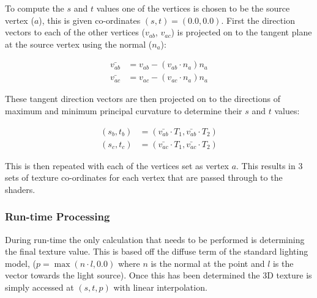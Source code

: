       To compute the $s$ and $t$ values one of the vertices is chosen to be the
      source vertex ($a$), this is given co-ordinates $\left(s, t\right) =
      \left(0.0, 0.0\right)$.  First the direction vectors to each of the other
      vertices ($v_{ab}$, $v_{ac}$) is projected on to the tangent plane at the
      source vertex using the normal ($n_a$):

      \begin{align}
        \bar{v_{ab}} &= v_{ab} - \left(v_{ab} \cdot n_a\right) n_a \\
        \bar{v_{ac}} &= v_{ac} - \left(v_{ac} \cdot n_a\right) n_a
      \end{align}

      These tangent direction vectors are then projected on to the directions of
      maximum and minimum principal curvature to determine their $s$ and $t$
      values:

      \begin{align}
        \left(s_b, t_b\right) &= \left(
          \bar{v_{ab}} \cdot T_1, \bar{v_{ab}} \cdot T_2
        \right) \\
        \left(s_c, t_c\right) &= \left(
          \bar{v_{ac}} \cdot T_1, \bar{v_{ac}} \cdot T_2
        \right)
      \end{align}

      This is then repeated with each of the vertices set as vertex $a$.  This
      results in 3 sets of texture co-ordinates for each vertex that are passed
      through to the shaders.

    \subsubsection{Run-time Processing}

      During run-time the only calculation that needs to be performed is
      determining the final texture value.  This is based off the diffuse term
      of the standard lighting model, ($p = \max\left(n \cdot l, 0.0\right)$
      where $n$ is the normal at the point and $l$ is the vector towards the
      light source).  Once this has been determined the 3D texture is simply
      accessed at $\left(s, t, p\right)$ with linear interpolation.
